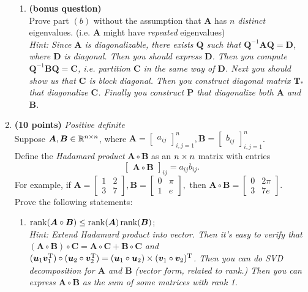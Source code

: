 \begin{enumerate}
\begin{enumerate}
\item \textbf{(bonus question)}\\
Prove part $(b)$ without the assumption that $\bm A$ has $n$ \textit{distinct} eigenvalues. (i.e. $\bm A$ might have \emph{repeated} eigenvalues)\\
\textit{Hint: Since $\bm A$ is diagonalizable, there exists $\bm Q$ such that $\bm Q^{-1}\bm A\bm Q=\bm D$, where $\bm D$ is diagonal. Then you should express $\bm D$. Then you compute $\bm Q^{-1}\bm B\bm Q=\bm C$, i.e. partition $\bm C$ in the same way of $\bm D$. Next you should show us that $\bm C$ is block diagonal. Then you construct \emph{diagonal} matrix $\bm T_*$ that diagonalize $\bm C$. Finally you construct $\bm P$ that diagonalize both $\bm A$ and $\bm B$.}
\end{enumerate}
\newpage
\item \textbf{(10 points)} \textit{Positive definite}\\
Suppose $\bm A,\bm B\in\mathbb{R}^{n\times n}$, where $\bm A=\begin{bmatrix}
a_{ij}
\end{bmatrix}_{i,j=1}^{n}, \bm B=\begin{bmatrix}
b_{ij}
\end{bmatrix}_{i,j=1}^{n}$.\\
Define the \emph{Hadamard product} $\bm A\circ\bm B$ as an $n\times n$ matrix with entries
\[
\begin{bmatrix}
\bm A\circ\bm B
\end{bmatrix}_{ij}=a_{ij}b_{ij}.
\]
For example, if $\bm A=\begin{bmatrix}
1&2\\3&7
\end{bmatrix},\bm B=\begin{bmatrix}
0&\pi\\1&e
\end{bmatrix},$ then $\bm A\circ\bm B=\begin{bmatrix}
0&2\pi\\3&7e
\end{bmatrix}.$\\
Prove the following statements:
\begin{enumerate}
\item
$\operatorname{rank}(\bm A\circ\bm B)\le\operatorname{rank}(\bm A)\operatorname{rank}(\bm B)$;
\\
\textit{Hint: Extend Hadamard product into vector. Then it's easy to verify that $(\bm A\circ\bm B)\circ\bm C=\bm A\circ\bm C+\bm B\circ\bm C$ and $(\bm u_1\bm v_1^{\mathrm T})\circ(\bm u_2\circ\bm v_2^{\mathrm T})=(\bm u_1\circ\bm u_2)\times(\bm v_1\circ\bm v_2)^{\mathrm T}$. Then you can do SVD decomposition for $\bm A$ and $\bm B$ (vector form, related to rank.) Then you can express $\bm A\circ\bm B$ as the sum of some matrices with rank 1.}

\end{enumerate}
\end{enumerate}
